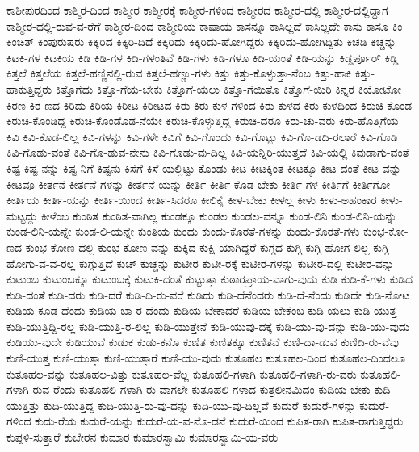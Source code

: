 {ಕಾಶೀಪುರದಿಂದ
ಕಾಶ್ಮಿರ-ದಿಂದ
ಕಾಶ್ಮೀರ
ಕಾಶ್ಮೀರಕ್ಕೆ
ಕಾಶ್ಮೀರ-ಗಳಿಂದ
ಕಾಶ್ಮೀರದ
ಕಾಶ್ಮೀರ-ದಲ್ಲಿ
ಕಾಶ್ಮೀರ-ದಲ್ಲಿದ್ದಾಗ
ಕಾಶ್ಮೀರ-ದಲ್ಲಿ-ರುವ-ವ-ರೆಗೆ
ಕಾಶ್ಮೀರ-ದಿಂದ
ಕಾಶ್ಮೀರಿಯ
ಕಾಷಾಯ
ಕಾಸನ್ನೂ
ಕಾಸಿಲ್ಲದೆ
ಕಾಸಿಲ್ಲದೇ
ಕಾಸು
ಕಾಸೂ
ಕಿಂ
ಕಿಂಚಿತ್
ಕಿಂಪುರುಷರು
ಕಿಕ್ಕಿರಿದ
ಕಿಕ್ಕಿರಿ-ದಿದೆ
ಕಿಕ್ಕಿರಿದು
ಕಿಕ್ಕಿರಿದು-ಹೋಗಿದ್ದರು
ಕಿಕ್ಕಿರಿದು-ಹೋಗಿದ್ದಿತು
ಕಿಚಡಿ
ಕಿಚ್ಚನ್ನು
ಕಿಟಕಿ-ಗಳ
ಕಿಟಕಿಯ
ಕಿಡಿ
ಕಿಡಿ-ಗಳ
ಕಿಡಿ-ಗಳಂತಿವೆ
ಕಿಡಿ-ಗಳು
ಕಿಡಿ-ಗಳೂ
ಕಿಡಿ-ಯಂತೆ
ಕಿಡಿ-ಯನ್ನು
ಕಿಡ್ಡರ್ಪೂರ್
ಕಿಡ್ಡಿ
ಕಿತ್ತಲೆ
ಕಿತ್ತಲೆಯ
ಕಿತ್ತಲೆ-ಹಣ್ಣಿನಲ್ಲಿ-ರುವ
ಕಿತ್ತಲೆ-ಹಣ್ಣು-ಗಳು
ಕಿತ್ತು
ಕಿತ್ತು-ಕೊಳ್ಳುತ್ತಾ-ನೆಂಬ
ಕಿತ್ತು-ಹಾಕಿ
ಕಿತ್ತು-ಹಾಕುತ್ತಿದ್ದರು
ಕಿತ್ತೊಗೆದು
ಕಿತ್ತೊ-ಗೆಯ-ಬೇಕು
ಕಿತ್ತೊಗೆ-ಯಲು
ಕಿತ್ತೊ-ಗೆಯಿತೊ
ಕಿತ್ತೊಗೆ-ಯಿರಿ
ಕಿನ್ನರ
ಕಿಯೋಟೋ
ಕಿರಣ
ಕಿರ-ಣದ
ಕಿರಿದು
ಕಿರಿಯ
ಕಿರೀಟ
ಕಿರೀಟದ
ಕಿರು
ಕಿರು-ಕುಳ-ಗಳಿಂದ
ಕಿರು-ಕುಳದ
ಕಿರು-ಕುಳದಿಂದ
ಕಿರುಚಿ-ಕೊಂಡ
ಕಿರುಚಿ-ಕೊಂಡಿದ್ದ
ಕಿರುಚಿ-ಕೊಂಡೊಡ-ನೆಯೇ
ಕಿರುಚಿ-ಕೊಳ್ಳುತ್ತಿದ್ದ
ಕಿರುಚಿ-ದರೂ
ಕಿರು-ಚು-ವರು
ಕಿರು-ಹೊತ್ತಿಗೆಯ
ಕಿವಿ
ಕಿವಿ-ಕೊಡ-ಲಿಲ್ಲ
ಕಿವಿ-ಗಳನ್ನು
ಕಿವಿ-ಗಳೇ
ಕಿವಿಗೆ
ಕಿವಿ-ಗೊಂದು
ಕಿವಿ-ಗೊಟ್ಟು
ಕಿವಿ-ಗೊ-ಡದಿ-ರಲಾರೆ
ಕಿವಿ-ಗೊಡಿ
ಕಿವಿ-ಗೊಡು-ವಂತೆ
ಕಿವಿ-ಗೊ-ಡುವ-ನೇನು
ಕಿವಿ-ಗೊಡು-ವು-ದಿಲ್ಲ
ಕಿವಿ-ಯನ್ನಿರಿ-ಯುತ್ತದೆ
ಕಿವಿ-ಯಲ್ಲಿ
ಕಿವುಡಾಗು-ವಂತೆ
ಕಿಷ್ಟ
ಕಿಷ್ಟ-ನನ್ನು
ಕಿಷ್ಟ-ನಿಗೆ
ಕಿಷ್ಟನು
ಕಿಸೆಗೆ
ಕಿಸೆ-ಯಲ್ಲಿಟ್ಟು-ಕೊಂಡು
ಕೀಟ
ಕೀಟಕ್ಕಿಂತ
ಕೀಟಕ್ಕೂ
ಕೀಟ-ದಂತೆ
ಕೀಟ-ವನ್ನು
ಕೀಟವೂ
ಕೀರ್ತನೆ
ಕೀರ್ತನೆ-ಗಳನ್ನು
ಕೀರ್ತನೆ-ಯನ್ನು
ಕೀರ್ತಿ
ಕೀರ್ತಿ-ಕೊಡ-ಬೇಕು
ಕೀರ್ತಿ-ಗಳ
ಕೀರ್ತಿಗೆ
ಕೀರ್ತಿಗೋ
ಕೀರ್ತಿಯ
ಕೀರ್ತಿ-ಯನ್ನು
ಕೀರ್ತಿ-ಯಿಂದ
ಕೀರ್ತಿ-ಸಿದರೂ
ಕೀಲಿಕೈ
ಕೀಳ-ಬೇಕು
ಕೀಳಲ್ಲ
ಕೀಳು
ಕೀಳು-ಅಹಂಕಾರ
ಕೀಳು-ಮಟ್ಟದ್ದು
ಕೀಳೆಂಬ
ಕುಂಠಿತ
ಕುಂಠಿತ-ವಾಗಿಲ್ಲ
ಕುಂಡಕ್ಕೂ
ಕುಂಡಲ
ಕುಂಡಲ-ವನ್ನೂ
ಕುಂಡ-ಲಿನಿ
ಕುಂಡ-ಲಿನಿ-ಯನ್ನು
ಕುಂಡ-ಲಿನಿ-ಯನ್ನೇ
ಕುಂಡ-ಲಿ-ಯನ್ನೇ
ಕುಂತಿಯ
ಕುಂದು
ಕುಂದು-ಕೊರತೆ-ಗಳನ್ನು
ಕುಂದು-ಕೊರತೆ-ಗಳು
ಕುಂಭ-ಕೋ-ಣದ
ಕುಂಭ-ಕೋಣ-ದಲ್ಲಿ
ಕುಂಭ-ಕೋಣ-ವನ್ನು
ಕುಕ್ಕಿದ
ಕುಕ್ಷಿ-ಯಾಗಿದ್ದರೆ
ಕುಗ್ಗದ
ಕುಗ್ಗಿ
ಕುಗ್ಗಿ-ಹೋಗ-ಲಿಲ್ಲ
ಕುಗ್ಗಿ-ಹೋಗು-ವ-ವ-ರಲ್ಲ
ಕುಗ್ಗುತ್ತಿದೆ
ಕುಚ್
ಕುಚ್ಚನ್ನು
ಕುಟೀರ
ಕುಟೀ-ರಕ್ಕೆ
ಕುಟೀರ-ಗಳನ್ನು
ಕುಟೀರ-ದಲ್ಲಿ
ಕುಟೀರ-ವನ್ನು
ಕುಟುಂಬ
ಕುಟುಂಬಕ್ಕೂ
ಕುಟುಂಬಕ್ಕೆ
ಕುಟುಕಿ-ದಂತೆ
ಕುಟ್ಟುತ್ತಾ
ಕುಠಾರಪ್ರಾಯ-ವಾಗು-ವುದು
ಕುಡಿ
ಕುಡಿ-ಕೆ-ಗಳು
ಕುಡಿದ
ಕುಡಿ-ದಂತೆ
ಕುಡಿ-ದರು
ಕುಡಿ-ದರೆ
ಕುಡಿ-ದಿ-ರು-ವರೆ
ಕುಡಿದು
ಕುಡಿ-ದೆನೆಂದರು
ಕುಡಿ-ದೆ-ನೆಂದು
ಕುಡಿದೇ
ಕುಡಿ-ನೋಟ
ಕುಡಿಯ-ಕೂಡ-ದೆಂದು
ಕುಡಿಯ-ಬಾ-ರ-ದೆಂದು
ಕುಡಿಯ-ಬೇಕಾದರೆ
ಕುಡಿಯ-ಬೇಕೆಂಬ
ಕುಡಿ-ಯಲು
ಕುಡಿ-ಯುತ್ತ
ಕುಡಿ-ಯುತ್ತಿದ್ದಿ-ರಲ್ಲ
ಕುಡಿ-ಯುತ್ತಿ-ರ-ಲಿಲ್ಲ
ಕುಡಿ-ಯುತ್ತೇನೆ
ಕುಡಿ-ಯುವು-ದಕ್ಕೆ
ಕುಡಿ-ಯು-ವು-ದನ್ನು
ಕುಡಿ-ಯು-ವುದು
ಕುಡಿಯು-ವುದೇ
ಕುಡಿಯುವೆ
ಕುಡುಕ
ಕುಡು-ಕನೊ
ಕುಣಿತ
ಕುಣಿತಕ್ಕೂ
ಕುಣಿತವೆ
ಕುಣಿ-ದಾ-ಡುವ
ಕುಣಿದಿ-ರು-ವೆವು
ಕುಣಿ-ಯುತ್ತ
ಕುಣಿ-ಯುತ್ತಾ
ಕುಣಿ-ಯುತ್ತಾರೆ
ಕುಣಿ-ಯು-ವುದು
ಕುತೂಹಲ
ಕುತೂಹಲ-ದಿಂದ
ಕುತೂಹಲ-ದಿಂದಲೂ
ಕುತೂಹಲ-ವನ್ನು
ಕುತೂಹಲ-ವಿತ್ತು
ಕುತೂಹಲ-ವೆಲ್ಲ
ಕುತೂಹಲಿ-ಗಳಾಗಿ
ಕುತೂಹಲಿ-ಗಳಾಗಿ-ರು-ವರು
ಕುತೂಹಲಿ-ಗಳಾಗಿ-ರುವ-ರೆಂದು
ಕುತೂಹಲಿ-ಗಳಾಗಿ-ರು-ವಾಗಲೇ
ಕುತೂಹಲಿ-ಗಳಾದ
ಕುತ್ರಲೀನಮಿದಂ
ಕುದಿಯ-ಬೇಕು
ಕುದಿ-ಯುತ್ತಿತ್ತು
ಕುದಿ-ಯುತ್ತಿದ್ದ
ಕುದಿ-ಯುತ್ತಿ-ರು-ವು-ದನ್ನು
ಕುದಿ-ಯು-ವು-ದಿಲ್ಲವೆ
ಕುದುರೆ
ಕುದುರೆ-ಗಳನ್ನು
ಕುದುರೆ-ಗಳಿಂದ
ಕುದು-ರೆಯ
ಕುದುರೆ-ಯನ್ನು
ಕುದುರೆ-ಯ-ವ-ನೊ-ಡನೆ
ಕುದುರೆ-ಯಿಂದ
ಕುಪಿತ-ರಾಗಿ
ಕುಪಿತ-ರಾಗುತ್ತಿದ್ದರು
ಕುಪ್ಪಳಿ-ಸುತ್ತಾರೆ
ಕುಬೇರನ
ಕುಮಾರ
ಕುಮಾರಸ್ವಾಮಿ
ಕುಮಾರಸ್ವಾಮಿ-ಯ-ವರು
}

